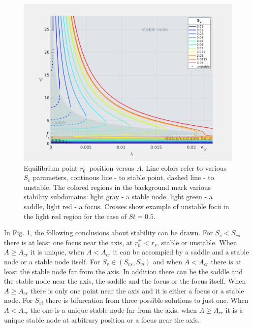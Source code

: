 \documentclass[../main.tex]{subfiles}
\begin{document}
\begin{figure}
\centering
\noindent \includegraphics[width=30pc]{gfx/r0_vs_A_plus_stability.png}
\caption{Equilibrium point $r^+_0$ position versus $A$. Line colors refer to various $S_v$ parameters, continous line - to stable point, dashed line - to unstable. The colored regions in the background mark various stability subdomains: light gray - a stable node, light green - a saddle, light red - a focus. Crosses show example of unstable focii in the light red region for the case of $St=0.5$.}
\label{fig:ch3_8}
\end{figure}

In Fig. \ref{fig:ch3_8}, the following conclusions about stability can be drawn.  For $S_v<S_{v s}$ there is at least one focus near the axis, at $r^+_0<r_s$, stable or unstable. When $A \geq A_{cr}$ it is unique, when $A<A_{cr}$ it can be accompied by a saddle and a stable node or a stable node itself. For $S_v \in (S_{v s},S_{v i})$ and when $A<A_{cr}$ there is at least the stable node far from the axis. In addition there can be the saddle and the stable node near the axis, the saddle and the focus or the focus itself. When $A \geq A_{cr}$ there is only one point near the axis and it is either a focus or a stable node. For $S_{v i}$ there is bifurcation from three possible solutions to just one. When $A<A_{cr}$ the one is a unique stable node far from the axis, when $A \geq A_{cr}$ it is a unique stable node at arbitrary position or a focus near the axis.\\
\end{document}
